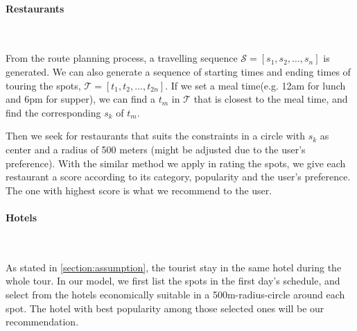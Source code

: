 \documentclass{mcmthesis}
\begin{document}
  \paragraph{Restaurants}\
  
  From the route planning process, a travelling sequence $\mathscr{S} = [s_{1}, s_{2}, \ldots, s_{n}]$ is generated. We can also generate a sequence of starting times and ending times of touring the spots, $\mathscr{T} = [t_{1}, t_{2}, \ldots, t_{2n}]$. If we set a meal time(e.g. 12am for lunch and 6pm for supper), we can find a $t_{m}$ in $\mathscr{T}$ that is closest to the meal time, and find the corresponding $s_{k}$ of $t_{m}$. \par
  Then we seek for restaurants that suits the constraints in a circle with $s_{k}$ as center and a radius of 500 meters (might be adjusted due to the user's preference). With the similar method we apply in rating the spots, we give each restaurant a score according to its category, popularity and the user's preference. The one with highest score is what we recommend to the user.
  \paragraph{Hotels}\
  
  As stated in \ref{section:assumption}, the tourist stay in the same hotel during the whole tour. In our model, we first list the spots in the first day's schedule, and select from the hotels economically suitable in a 500m-radius-circle around each spot. The hotel with best popularity among those selected ones will be our recommendation.
\end{document}
